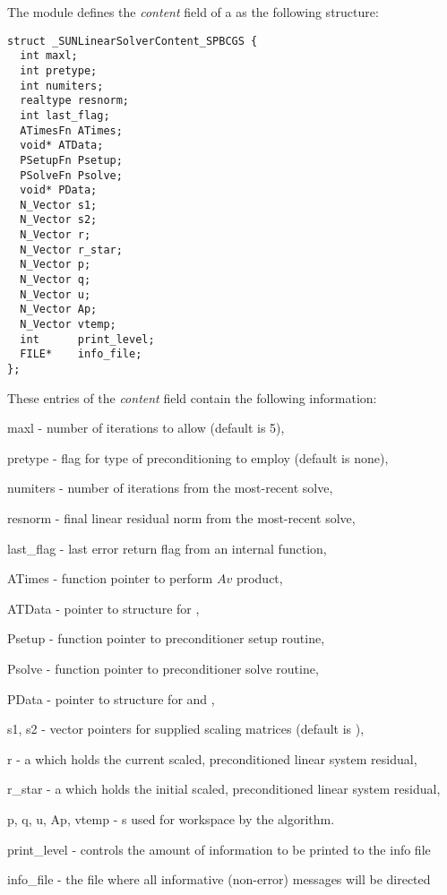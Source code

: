 The {\sunlinsolspbcgs} module defines the \textit{content} field of a
 as the following structure:
\begin{verbatim}
struct _SUNLinearSolverContent_SPBCGS {
  int maxl;
  int pretype;
  int numiters;
  realtype resnorm;
  int last_flag;
  ATimesFn ATimes;
  void* ATData;
  PSetupFn Psetup;
  PSolveFn Psolve;
  void* PData;
  N_Vector s1;
  N_Vector s2;
  N_Vector r;
  N_Vector r_star;
  N_Vector p;
  N_Vector q;
  N_Vector u;
  N_Vector Ap;
  N_Vector vtemp;
  int      print_level;
  FILE*    info_file;
};
\end{verbatim}
These entries of the \emph{content} field contain the following
information:
\begin{args}
  \item[maxl] - number of {\spbcgs} iterations to allow (default is 5),
  \item[pretype] - flag for type of preconditioning to employ
    (default is none),
  \item[numiters] - number of iterations from the most-recent solve,
  \item[resnorm] - final linear residual norm from the most-recent solve,
  \item[last\_flag] - last error return flag from an internal function,
  \item[ATimes] - function pointer to perform $Av$ product,
  \item[ATData] - pointer to structure for ,
  \item[Psetup] - function pointer to preconditioner setup routine,
  \item[Psolve] - function pointer to preconditioner solve routine,
  \item[PData] - pointer to structure for  and ,
  \item[s1, s2] - vector pointers for supplied scaling matrices
    (default is ),
  \item[r] - a {\nvector} which holds the current scaled,
    preconditioned linear system residual,
  \item[r\_star] - a {\nvector} which holds the initial scaled,
    preconditioned linear system residual,
  \item[p, q, u, Ap, vtemp] - {\nvector}s used for workspace by the
    {\spbcgs} algorithm.
  \item[print\_level] - controls the amount of information to be printed to the info file
  \item[info\_file]   - the file where all informative (non-error) messages will be directed
\end{args}
